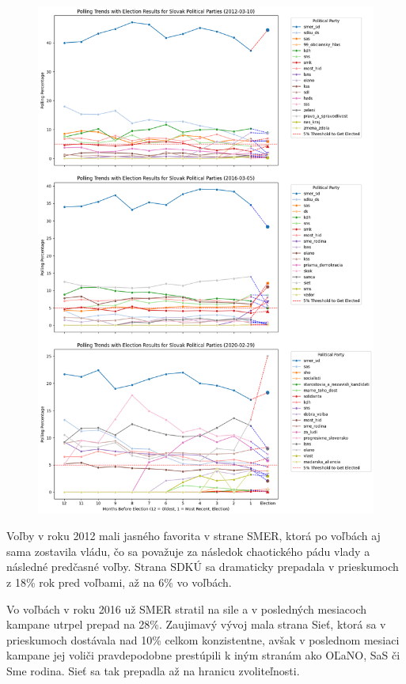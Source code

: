 \documentclass[main.tex]{subfiles}
\begin{document}
\begin{figure}[H]
    \centering
    \includegraphics[width=\textwidth]{images_exploratory/Polls_with_result_ALL.png}
    \caption{}
\end{figure}

\newpage

Voľby v roku 2012 mali jasného favorita v strane SMER, ktorá po voľbách aj sama zostavila vládu, čo sa považuje za následok chaotického pádu vlady a následné predčasné voľby. Strana SDKÚ sa dramaticky prepadala v prieskumoch z 18\% rok pred voľbami, až na 6\% vo voľbách. 

Vo voľbách v roku 2016 už SMER stratil na sile a v posledných mesiacoch kampane utrpel prepad na 28\%. Zaujimavý vývoj mala strana Sieť, ktorá sa v prieskumoch dostávala nad 10\% celkom konzistentne, avšak v poslednom mesiaci kampane jej voliči pravdepodobne prestúpili k iným stranám ako OĽaNO, SaS či Sme rodina. Sieť sa tak prepadla až na hranicu zvoliteľnosti.
\end{document}

